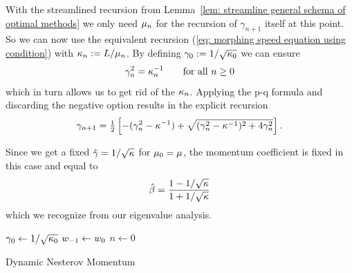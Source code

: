 With the streamlined recursion from Lemma~\ref{lem: streamline general schema of optimal methods}
we only need \(\mu_n\) for the recursion of \(\gamma_{n+1}\) itself at this
point. So we can now use the equivalent recursion (\ref{eq: morphing speed
equation using condition}) with \(\kappa_n:=L/\mu_n\).
By defining \(\gamma_0:=1/\sqrt{\kappa_0}\) we can ensure
\begin{align*}
	\gamma_n^2 = \kappa_n^{-1} \qquad  \text{for all } n\ge0
\end{align*}
which in turn allows us to get rid of the \(\kappa_n\). Applying the p-q
formula and discarding the negative option results in the explicit recursion
\begin{align*}
	\gamma_{n+1}
	= \tfrac12 \left[
		-(\gamma_n^2 - \kappa^{-1})
		+ \sqrt{(\gamma_n^2 - \kappa^{-1})^2 + 4 \gamma_n^2}
	\right].
\end{align*}

Since we get a fixed \(\hat{\gamma}=1/\sqrt{\kappa}\) for
\(\mu_0=\mu\), the momentum coefficient is fixed in this case and equal to 
\begin{align*}
	\hat{\beta} = \frac{1-1/\sqrt{\kappa}}{1+1/\sqrt{\kappa}}
\end{align*}
which we recognize from our eigenvalue analysis.

\begin{algorithm}
	\(\gamma_0 \leftarrow 1/\sqrt{\kappa_0}\)
	\(w_{-1} \leftarrow w_0\)\;
	\(n\leftarrow 0\)\;
	\caption{Dynamic Nesterov Momentum\label{algo: dynamic nesterov momentum}}
\end{algorithm}


